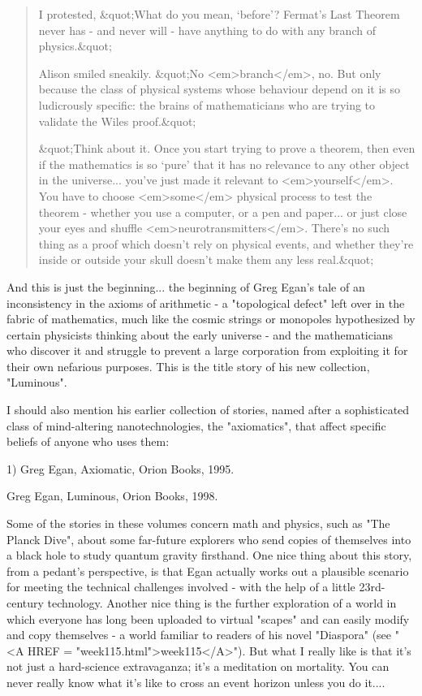 \begin{quote}
     I protested, &quot;What do you mean, `before'?  Fermat's Last Theorem
     never has - and never will - have anything to do with any branch 
     of physics.&quot;

     Alison smiled sneakily.  &quot;No <em>branch</em>, no.  But only because the 
     class of physical systems whose behaviour depend on it is so 
     ludicrously specific: the brains of mathematicians who are trying
     to validate the Wiles proof.&quot;

     &quot;Think about it.  Once you start trying to prove a theorem, then
     even if the mathematics is so `pure' that it has no relevance to
     any other object in the universe... you've just made it relevant
     to <em>yourself</em>.  You have to choose <em>some</em> physical process to test
     the theorem - whether you use a computer, or a pen and paper... or
     just close your eyes and shuffle <em>neurotransmitters</em>.  There's no
     such thing as a proof which doesn't rely on physical events, and
     whether they're inside or outside your skull doesn't make them
     any less real.&quot;
\end{quote}
    
And this is just the beginning... the beginning of Greg Egan's tale of
an inconsistency in the axioms of arithmetic - a "topological defect"
left over in the fabric of mathematics, much like the cosmic strings or
monopoles hypothesized by certain physicists thinking about the early
universe - and the mathematicians who discover it and struggle to
prevent a large corporation from exploiting it for their own nefarious
purposes.  This is the title story of his new collection, "Luminous".

I should also mention his earlier collection of stories, named after a
sophisticated class of mind-altering nanotechnologies, the "axiomatics",
that affect specific beliefs of anyone who uses them:

1) Greg Egan, Axiomatic, Orion Books, 1995.

Greg Egan, Luminous, Orion Books, 1998.

Some of the stories in these volumes concern math and physics, such as
"The Planck Dive", about some far-future explorers who send copies of
themselves into a black hole to study quantum gravity firsthand.  One
nice thing about this story, from a pedant's perspective, is that Egan
actually works out a plausible scenario for meeting the technical
challenges involved - with the help of a little 23rd-century technology.
Another nice thing is the further exploration of a world in which
everyone has long been uploaded to virtual "scapes" and can easily
modify and copy themselves - a world familiar to readers of his novel
"Diaspora" (see "<A HREF = "week115.html">week115</A>").  But what I really like is that it's not
just a hard-science extravaganza; it's a meditation on mortality.  You
can never really know what it's like to cross an event horizon unless 
you do it....

